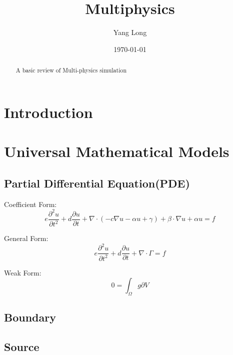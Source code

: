 \documentclass[%
 reprint,
 amsmath,amssymb,
 aps,
rmp,
]{revtex4-1}
\begin{document}

\title{Multiphysics}%

\author{Yang Long}

\date{\today}

\begin{abstract}
A basic review of Multi-physics simulation
\end{abstract}

\maketitle

\section{Introduction}

\section{Universal Mathematical Models}

\subsection{Partial Differential Equation(PDE)}
Coefficient Form:
\begin{equation}
e\frac{\partial^2 u}{\partial t^2} + d \frac{\partial u}{\partial t} + \nabla\cdot(-c \nabla u-\alpha u +\gamma) + \beta\cdot \nabla u + \alpha u = f
\label{eq:coefficientform}
\end{equation}

General Form:
\begin{equation}
e\frac{\partial^2 u}{\partial t^2} + d \frac{\partial u}{\partial t} + \nabla\cdot\Gamma = f
\label{eq:generalform}
\end{equation}

Weak Form:
\begin{equation}
0 = \int_{\Omega} g \partial V
\label{eq:weakform}
\end{equation}

\subsection{Boundary}

\subsection{Source}
\end{document}
